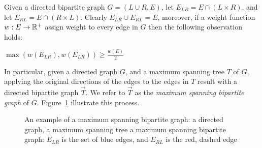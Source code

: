 \label{sub:bipartition}
Given a directed bipartite graph $G = (L\cup R, E)$, 
let $E_{LR} = E \cap (L \times R)$, 
and let $E_{RL} = E \cap (R \times L)$.
Clearly $E_{LR} \cup E_{RL} = E$, moreover, 
if a weight function $w:E \rightarrow \mathbb{R^+}$ 
assign weight to every edge in $G$ then the following observation holds:
\begin{observation}
\label{ob:bipartition}
$\max(w(E_{LR}), w(E_{LR})) \geq \frac{w(E)}{2}$
\end{observation}

In particular, given a directed graph $G$, 
and a maximum spanning tree $T$ of $G$, 
applying the original directions of the edges to the edges in $T$ result 
with a directed bipartite graph $\overrightarrow{T}$.
We refer to $\overrightarrow{T}$ as the \emph{maximum spanning bipartite graph}
of $G$. 
Figure~\ref{fig:spanning-bipartite-graph} illustrate this process.   

\begin{figure}
\centering

\caption{
\label{fig:spanning-bipartite-graph}
An example of a maximum spanning bipartite graph:
 a directed graph, 
 a maximum spanning tree  
 a maximum spanning bipartite graph:
$E_{LR}$ is the set of blue edges, 
and $E_{RL}$ is the red, dashed edge   
}
\end{figure}
 